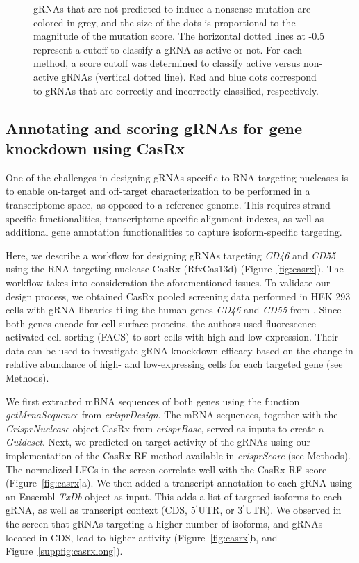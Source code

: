 \documentclass[pdftex,english,10pt]{article}
\begin{document}
\begin{figure}
{ gRNAs that are not predicted to induce a nonsense mutation are colored in grey, and the size of the dots is proportional to the magnitude of the mutation score. The horizontal dotted lines at -0.5 represent a cutoff to classify a gRNA as active or not. For each method, a score cutoff was determined to classify active versus non-active gRNAs (vertical dotted line). Red and blue dots correspond to gRNAs that are correctly and incorrectly classified, respectively. }
  \label{fig:crisprbe}
\end{figure}



\subsection{Annotating and scoring gRNAs for gene knockdown using CasRx}

One of the challenges in designing gRNAs specific to RNA-targeting nucleases is to enable on-target and off-target characterization to be performed in a transcriptome space, as opposed to a reference genome. This requires strand-specific functionalities, transcriptome-specific alignment indexes, as well as additional gene annotation functionalities to capture isoform-specific targeting.  

Here, we describe a workflow for designing gRNAs targeting \textit{CD46} and \textit{CD55} using the RNA-targeting nuclease CasRx (RfxCas13d) \citep{cas13d} (Figure~\ref{fig:casrx}).
The workflow takes into consideration the aforementioned issues. To validate our design process, we obtained CasRx pooled screening data performed in HEK 293 cells with gRNA libraries tiling the human genes \textit{CD46} and \textit{CD55} from \citet{wessels2020massively}. Since both genes encode for cell-surface proteins, the authors used fluorescence-activated cell sorting (FACS) to sort cells with high and low expression. Their data can be used to investigate gRNA knockdown efficacy based on the change in relative abundance of high- and low-expressing cells for each targeted gene (see Methods). 

We first extracted mRNA sequences of both genes using the function \textit{getMrnaSequence} from \textit{crisprDesign}. 
The mRNA sequences, together with the \textit{CrisprNuclease} object CasRx from \textit{crisprBase}, served as inputs to create a \textit{Guideset}.
Next, we predicted on-target activity of the gRNAs using our implementation of the CasRx-RF method \citep{wessels2020massively} available in \textit{crisprScore} (see Methods). The normalized LFCs in the screen correlate well with the CasRx-RF score (Figure~\ref{fig:casrx}a). We then added a transcript annotation to each gRNA using an Ensembl \textit{TxDb} object as input. This adds a list of targeted isoforms to each gRNA, as well as transcript context (CDS, $5^{\prime}$UTR, or $3^{\prime}$UTR). We observed in the screen that gRNAs targeting a higher number of isoforms, and gRNAs located in CDS, lead to higher activity (Figure~\ref{fig:casrx}b, and Figure~\ref{suppfig:casrxlong}). 
\end{document}

